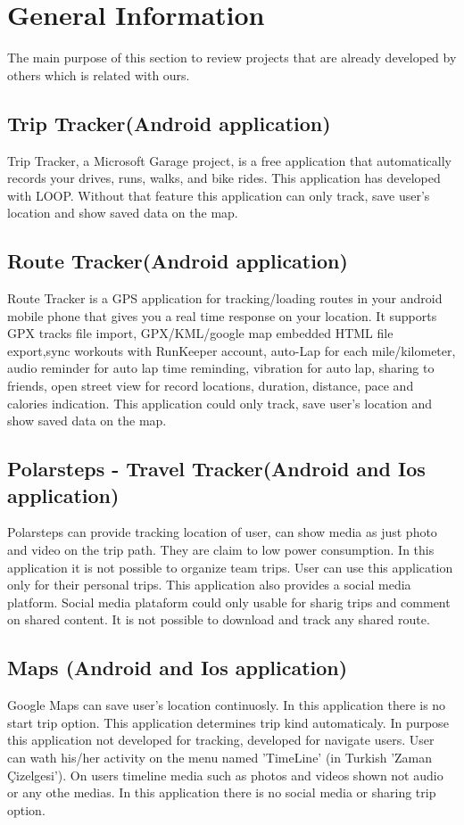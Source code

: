 \chapter{General Information}
The main purpose of this section to review projects that are already developed by others which is related with ours.
\section{Trip Tracker(Android application)}
Trip Tracker\cite{triptracker}, a Microsoft Garage project, is a free application that automatically records your drives, runs, walks, and bike rides. This application has developed with LOOP\cite{loop}. Without that feature this application can only track, save user's location and show saved data on the map.

\section{Route Tracker(Android application)}
Route Tracker\cite{routetracker} is a GPS application for tracking/loading routes in your android mobile phone that gives you a real time response on your location. It supports GPX tracks file import, GPX/KML/google map embedded HTML file export,sync workouts with RunKeeper account, auto-Lap for each mile/kilometer, audio reminder for auto lap time reminding, vibration for auto lap, sharing to friends, open street view for record locations, duration, distance, pace and calories indication. This application could only track, save user's location and show saved data on the map.

\section{Polarsteps - Travel Tracker(Android and Ios application)}
Polarsteps\cite{polarsteps} can provide tracking location of user, can show media as just photo and video on the trip path. They are claim to low power consumption. In this application it is not possible to organize team trips. User can use this application only for their personal trips. This application also provides a social media platform. Social media plataform could only usable for sharig trips and comment on shared content. It is not possible to download and track any shared route.

\section{Maps (Android and Ios application)}
Google Maps\cite{googlemap} can save user's location continuosly. In this application there is no start trip option. This application determines trip kind automaticaly. In purpose this application not developed for tracking, developed for navigate users. User can wath his/her activity on the menu named 'TimeLine' (in Turkish 'Zaman Çizelgesi'). On users timeline media such as photos and videos shown not audio or any othe medias. In this application there is no social media or sharing trip option.
